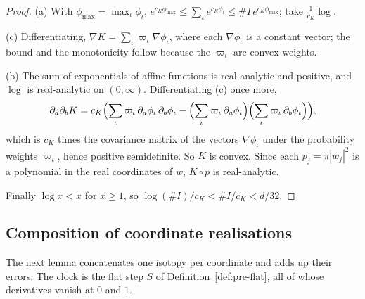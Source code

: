 \begin{proof}
(a) With $\phi_{\max}=\max_\iota\phi_\iota$,
$e^{c_K\phi_{\max}}\le\sum_\iota e^{c_K\phi_\iota}\le\#I\,e^{c_K\phi_{\max}}$; take $\frac1{c_K}\log$.

(c) Differentiating, $\nabla K=\sum_\iota\varpi_\iota\nabla\phi_\iota$, where each $\nabla\phi_\iota$ is a constant
vector; the bound and the monotonicity follow because the $\varpi_\iota$ are convex weights.

(b) The sum of exponentials of affine functions is real-analytic and positive, and $\log$ is real-analytic on
$(0,\infty)$. Differentiating (c) once more,
\[
 \partial_a\partial_bK=c_K\Bigl(\sum_\iota\varpi_\iota\,\partial_a\phi_\iota\,\partial_b\phi_\iota
 -\Bigl(\sum_\iota\varpi_\iota\,\partial_a\phi_\iota\Bigr)\Bigl(\sum_\iota\varpi_\iota\,\partial_b\phi_\iota\Bigr)\Bigr),
\]
which is $c_K$ times the covariance matrix of the vectors $\nabla\phi_\iota$ under the probability weights
$\varpi_\iota$, hence positive semidefinite. So $K$ is convex. Since each $p_j=\pi|w_j|^2$ is a polynomial in the real
coordinates of $w$, $K\circ p$ is real-analytic.

Finally $\log x<x$ for $x\ge1$, so $\log(\#I)/c_K<\#I/c_K<d/32$.
\end{proof}

\subsection{Composition of coordinate realisations}\label{sec:fcp-composition}

The next lemma concatenates one isotopy per coordinate and adds up their errors. The clock is the flat step $S$ of
Definition~\ref{def:pre-flat}, all of whose derivatives vanish at $0$ and $1$.

